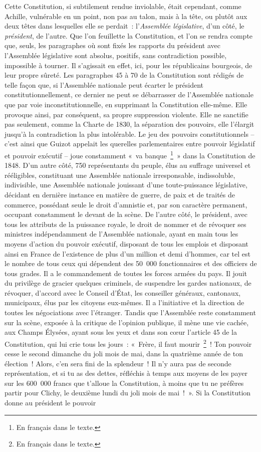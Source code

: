 \documentclass[french,twoside]{book} %
\begin{document}
Cette Constitution, si subtilement rendue inviolable, était cependant, comme Achille, vulnérable en un point, non pas au talon, mais à la tête, ou plutôt aux deux têtes dans lesquelles elle se perdait : l’\emph{Assemblée législative}, d’un côté, le \emph{président}, de l’autre. Que l’on feuillette la Constitution, et l’on se rendra compte que, seuls, les paragraphes où sont fixés les rapports du président avec l’Assemblée législative sont absolus, positifs, sans contradiction possible, impossible à tourner. Il s’agissait en effet, ici, pour les républicains bourgeois, de leur propre sûreté. Les paragraphes 45 à 70 de la Constitution sont rédigés de telle façon que, si l’Assemblée nationale peut écarter le président constitutionnellement, ce dernier ne peut se débarrasser de l’Assemblée nationale que par voie inconstitutionnelle, en supprimant la Constitution elle-même. Elle provoque ainsi, par conséquent, sa propre suppression violente. Elle ne sanctifie pas seulement, comme la Charte de 1830, la séparation des pouvoirs, elle l’élargit jusqu’à la contradiction la plus intolérable. Le jeu des pouvoirs constitutionnels – c’est ainsi que Guizot appelait les querelles parlementaires entre pouvoir législatif et pouvoir exécutif – joue constamment « va banque \footnote{En français dans le texte.} » dans la Constitution de 1848. D’un autre côté, 750 représentants du peuple, élus au suffrage universel et rééligibles, constituant une Assemblée nationale irresponsable, indissoluble, indivisible, une Assemblée nationale jouissant d’une toute-puissance législative, décidant en dernière instance en matière de guerre, de paix et de traités de commerce, possédant seule le droit d’amnistie et, par son caractère permanent, occupant constamment le devant de la scène. De l’autre côté, le président, avec tous les attributs de la puissance royale, le droit de nommer et de révoquer ses ministres indépendamment de l’Assemblée nationale, ayant en main tous les moyens d’action du pouvoir exécutif, disposant de tous les emplois et disposant ainsi en France de l’existence de plus d’un million et demi d’hommes, car tel est le nombre de tous ceux qui dépendent des 50 000 fonctionnaires et des officiers de tous grades. Il a le commandement de toutes les forces armées du pays. Il jouit du privilège de gracier quelques criminels, de suspendre les gardes nationaux, de révoquer, d’accord avec le Conseil d’État, les conseiller généraux, cantonaux, municipaux, élus par les citoyens eux-mêmes. Il a l’initiative et la direction de toutes les négociations avec l’étranger. Tandis que l’Assemblée reste constamment sur la scène, exposée à la critique de l’opinion publique, il mène une vie cachée, aux Champs Élysées, ayant sous les yeux et dans son cœur l’article 45 de la Constitution, qui lui crie tous les jours : « Frère, il faut mourir \footnote{En français dans le texte.} ! Ton pouvoir cesse le second dimanche du joli mois de mai, dans la quatrième année de ton élection ! Alors, c’en sera fini de la splendeur ! Il n’y aura pas de seconde représentation, et si tu as des dettes, réfléchis à temps aux moyens de les payer sur les 600 000 francs que t’alloue la Constitution, à moins que tu ne préfères partir pour Clichy, le deuxième lundi du joli mois de mai ! ». Si la Constitution donne au président le pouvoir 
\end{document}
